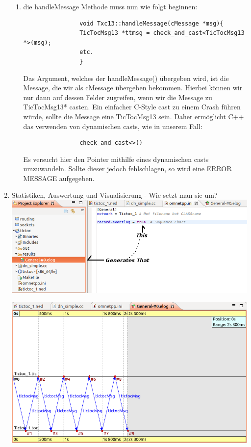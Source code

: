 \documentclass[11pt]{article}
\begin{document}
\begin{enumerate}[\thesubsection .1]
\begin{enumerate}
            \item{die handleMessage Methode muss nun wie folgt beginnen:\\}

            \begin{lstlisting}
                void Txc13::handleMessage(cMessage *msg){
                TicTocMsg13 *ttmsg = check_and_cast<TicTocMsg13 *>(msg);
                etc.
                }
            \end{lstlisting}
            Das Argument, welches der handleMessage() übergeben wird, ist die Message,
            die wir als cMessage übergeben bekommen. Hierbei können wir nur dann auf
            dessen Felder zugreifen, wenn wir die Message zu TicTocMsg13* casten.
            Ein einfacher C-Style cast zu einem Crash führen würde, sollte die Message
            eine TicTocMsg13 sein. Daher ermöglicht C++ das verwenden von dynamischen casts,
            wie in unserem Fall:
            \begin{lstlisting}
                check_and_cast<>()
            \end{lstlisting}
            Es versucht hier den Pointer mithilfe eines dynamischen casts umzuwandeln. Sollte
            dieser jedoch fehlschlagen, so wird eine ERROR MESSAGE aufgegeben.

        \end{enumerate}

        \item Statistiken, Auswertung und Visualisierung - Wie setzt man sie um?\\

        \includegraphics[width=\textwidth]{charting1.png}

        \includegraphics[width=\textwidth]{charting2.png}


    \end{enumerate}
\end{document}
